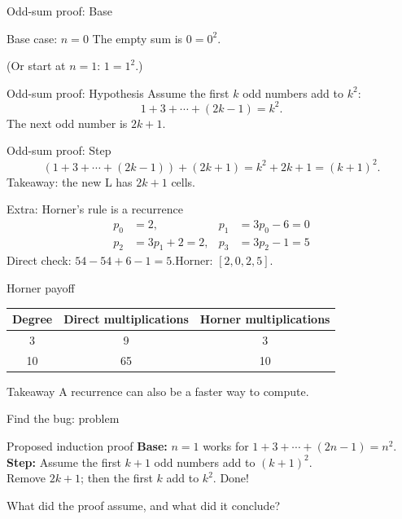 \documentclass[aspectratio=169,10pt]{beamer}
\begin{document}
\begin{frame}{Odd-sum proof: Base}
  \begin{block}{Base case: $n=0$}
    The empty sum is $0=0^2$.
  \end{block}
  (Or start at $n=1$: $1=1^2$.)
\end{frame}

\begin{frame}{Odd-sum proof: Hypothesis}
  Assume the first $k$ odd numbers add to $k^2$:
  \[
    1+3+\cdots+(2k-1)=k^2.
  \]
  The next odd number is $2k+1$.
\end{frame}

\begin{frame}{Odd-sum proof: Step}
  \[
    (1+3+\cdots+(2k-1))+(2k+1)
      =k^2+2k+1=(k+1)^2.
  \]
  \centering\Large Takeaway: the new L has $2k+1$ cells.
\end{frame}

\begin{frame}{Extra: Horner's rule is a recurrence}
  \begin{align*}
    p_0&=2, & p_1&=3p_0-6=0\\
    p_2&=3p_1+2=2, & p_3&=3p_2-1=5
  \end{align*}
  Direct check: $54-54+6-1=5$.\qquad Horner: $[2,0,2,5]$.
\end{frame}

\begin{frame}{Horner payoff}
  \centering
  \begin{tabular}{c|cc}
    Degree & Direct multiplications & Horner multiplications\\ \hline
    3 & 9 & 3\\
    10 & 65 & 10
  \end{tabular}
  \vfill\begin{block}{Takeaway}
    A recurrence can also be a faster way to compute.
  \end{block}
\end{frame}

\begin{frame}{Find the bug: problem}
  \begin{block}{Proposed induction proof}
    \textbf{Base:} $n=1$ works for $1+3+\cdots+(2n-1)=n^2$.\\
    \textbf{Step:} Assume the first $k+1$ odd numbers add to $(k+1)^2$.\\
    Remove $2k+1$; then the first $k$ add to $k^2$. Done!
  \end{block}
  \centering\Large What did the proof assume, and what did it conclude?
\end{frame}
\end{document}
